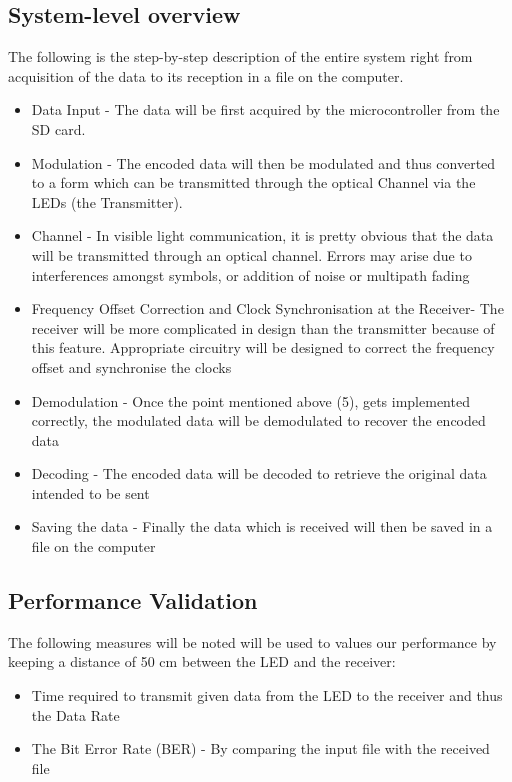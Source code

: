 \documentclass{article}
\begin{document}
\subsection{System-level overview}
The following is the step-by-step description of the entire system right from acquisition of the data to its reception in a file on the computer.
\begin{itemize}
\item Data Input - The data will be first acquired by the microcontroller from the SD card. 
\item Modulation - The encoded data will then be modulated and thus converted to a form which can be transmitted through the optical Channel via the LEDs (the Transmitter).
\item Channel - In visible light communication, it is pretty obvious that the data will be transmitted through an optical channel. Errors may arise due to interferences amongst symbols, or addition of noise or multipath fading
\item Frequency Offset Correction and Clock Synchronisation at the Receiver- The receiver will be more complicated in design than the transmitter because of this feature. Appropriate circuitry will be designed to correct the frequency offset and synchronise the clocks
\item Demodulation - Once the point mentioned above (5), gets implemented correctly, the modulated data will be demodulated to recover the encoded data
\item Decoding - The encoded data will be decoded to retrieve the original data intended to be sent
\item Saving the data - Finally the data which is received will then be saved in a file on the computer
\end{itemize}

\subsection{Performance Validation}
The following measures will be noted will be used to values our performance by keeping a distance of 50 cm between the LED and the receiver:
\begin{itemize}
\item Time required to transmit given data from the LED to the receiver and thus the Data Rate
\item The Bit Error Rate (BER) - By comparing the input file with the received file
\end{itemize}
\end{document}
